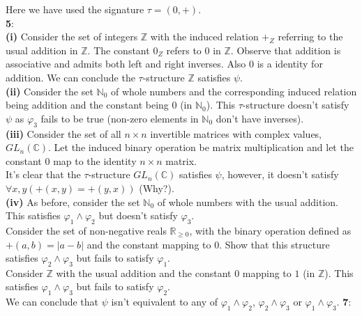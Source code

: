 \documentclass{article}
\begin{document}
\begin{flushleft}
Here we have used the signature $\tau=(0,+)$.\\
\textbf{5}:\\
\textbf{(i)} Consider the set of integers $\mathbb{Z}$ with the induced relation $+_Z$ referring to the usual addition in $\mathbb{Z}$. The constant $0_Z$ refers to $0$ in $\mathbb{Z}$. Observe that addition is associative and admits both left and right inverses. Also $0$ is a identity for addition.
We can conclude the $\tau$-structure $\mathbb{Z}$ satisfies $\psi$.\\
\textbf{(ii)} Consider the set $\mathbb{N}_0$ of whole numbers and the corresponding induced relation being addition and the constant being $0$ (in $\mathbb{N}_0$). This $\tau$-structure doesn't satisfy $\psi$ as $\varphi_3$ fails to be true (non-zero elements in $\mathbb{N}_0$ don't have inverses).\\
\textbf{(iii)} Consider the set of all $n\times n$ invertible matrices with complex values, $GL_n(\mathbb{C})$. Let the induced binary operation be matrix multiplication and let the constant $0$ map to the identity $n\times n$ matrix.\\
It's clear that the $\tau$-structure $GL_n(\mathbb{C})$ satisfies $\psi$, however, it doesn't satisfy $\forall x,y(+(x,y)=+(y,x))$ (Why?).\\
\textbf{(iv)} As before, consider the set $\mathbb{N}_0$ of whole numbers with the usual addition. This satisfies $\varphi_1\wedge\varphi_2$ but doesn't satisfy $\varphi_3$.\\
Consider the set of non-negative reals $\mathbb{R}_{\geq0}$, with the binary operation defined as $+(a,b)=|a-b|$ and the constant mapping to $0$. Show that this structure satisfies $\varphi_2\wedge \varphi_3$ but fails to satisfy $\varphi_1$.\\
Consider $\mathbb{Z}$ with the usual addition and the constant $0$ mapping to $1$ (in $\mathbb{Z}$). This satisfies $\varphi_1\wedge\varphi_3$ but fails to satisfy $\varphi_2$.\\
We can conclude that $\psi$ isn't equivalent to any of $\varphi_1\wedge\varphi_2$, $\varphi_2\wedge\varphi_3$ or $\varphi_1\wedge\varphi_3$.
\clearpage
\textbf{7}:

\begin{tikzpicture}[x=0.75pt,y=0.75pt,yscale=-1,xscale=1]


\end{tikzpicture}
\end{flushleft}
\end{document}
